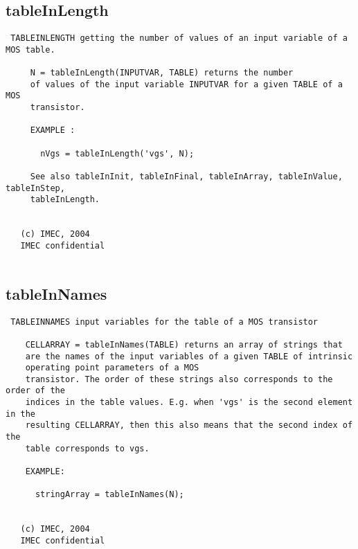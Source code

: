 \newpage
\subsection{tableInLength}
\label{sec:tableInLength}
\begin{verbatim}
 TABLEINLENGTH getting the number of values of an input variable of a MOS table.
 
     N = tableInLength(INPUTVAR, TABLE) returns the number
     of values of the input variable INPUTVAR for a given TABLE of a MOS
     transistor.
 
     EXAMPLE :
 
       nVgs = tableInLength('vgs', N);
 
     See also tableInInit, tableInFinal, tableInArray, tableInValue, tableInStep,
     tableInLength.
 
 
   (c) IMEC, 2004
   IMEC confidential 
 

\end{verbatim}

\newpage
\subsection{tableInNames}
\label{sec:tableInNames}
\begin{verbatim}
 TABLEINNAMES input variables for the table of a MOS transistor
 
    CELLARRAY = tableInNames(TABLE) returns an array of strings that 
    are the names of the input variables of a given TABLE of intrinsic 
    operating point parameters of a MOS
    transistor. The order of these strings also corresponds to the order of the
    indices in the table values. E.g. when 'vgs' is the second element in the
    resulting CELLARRAY, then this also means that the second index of the
    table corresponds to vgs.
 
    EXAMPLE:
 
      stringArray = tableInNames(N);
 
 
   (c) IMEC, 2004
   IMEC confidential 
 

\end{verbatim}

\newpage
